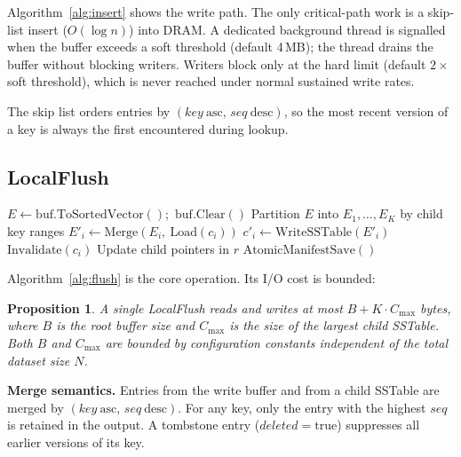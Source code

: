\documentclass[10pt,twocolumn]{article}
\newtheorem{proposition}[theorem]{Proposition}
\begin{document}
Algorithm~\ref{alg:insert} shows the write path.  The only critical-path work
is a skip-list insert ($O(\log n)$) into DRAM.  A dedicated background thread
is signalled when the buffer exceeds a soft threshold (default 4\,MB); the
thread drains the buffer without blocking writers.  Writers block only at the
hard limit (default $2\times$ soft threshold), which is never reached under
normal sustained write rates.

The skip list orders entries by $(\mathit{key}\ \mathrm{asc},\,
\mathit{seq}\ \mathrm{desc})$, so the most recent version of a key is always
the first encountered during lookup.

\subsection{LocalFlush}

\begin{algorithm}[t]
\caption{LocalFlush(root $r$)}
\label{alg:flush}
\begin{algorithmic}[1]
\State $E \gets \mathrm{buf.ToSortedVector}()$;\ $\mathrm{buf.Clear}()$
\State Partition $E$ into $E_1, \ldots, E_K$ by child key ranges
  \State $E'_i \gets \mathrm{Merge}(E_i,\ \mathrm{Load}(c_i))$ 
  \State $c'_i \gets \mathrm{WriteSSTable}(E'_i)$ 
  \State $\mathrm{Invalidate}(c_i)$ 
\EndFor
\State Update child pointers in $r$
\State $\mathrm{AtomicManifestSave}()$
\end{algorithmic}
\end{algorithm}

Algorithm~\ref{alg:flush} is the core operation.  Its I/O cost is bounded:

\begin{proposition}
\label{prop:io}
A single LocalFlush reads and writes at most
$B + K \cdot C_{\max}$ bytes, where $B$ is the root buffer size and
$C_{\max}$ is the size of the largest child SSTable.  Both $B$ and
$C_{\max}$ are bounded by configuration constants independent of the
total dataset size $N$.
\end{proposition}

\textbf{Merge semantics.}  Entries from the write buffer and from a child
SSTable are merged by $(\mathit{key}\ \mathrm{asc},\, \mathit{seq}\
\mathrm{desc})$.  For any key, only the entry with the highest
$\mathit{seq}$ is retained in the output.  A tombstone entry
($\mathit{deleted} = \mathrm{true}$) suppresses all earlier versions of
its key.
\end{document}
